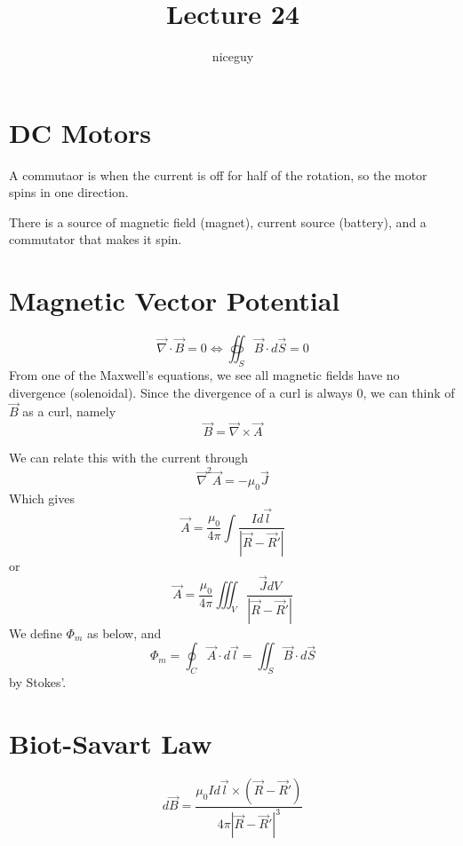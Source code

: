 \documentclass[12pt]{article}
\author{niceguy}
\title{Lecture 24}
\begin{document}
\maketitle

\section{DC Motors}
A commutaor is when the current is off for half of the rotation, so the motor spins in one direction. 

\begin{ex}
	There is a source of magnetic field (magnet), current source (battery), and a commutator that makes it spin.
\end{ex}

\section{Magnetic Vector Potential}

$$\vec{\nabla} \cdot \vec{B} = 0 \Leftrightarrow \oiint_S \vec{B} \cdot d\vec{S} = 0$$
From one of the Maxwell's equations, we see all magnetic fields have no divergence (solenoidal). Since the divergence of a curl is always 0, we can think of $\vec{B}$ as a curl, namely
$$\vec{B} = \vec{\nabla} \times \vec{A}$$

We can relate this with the current through
$$\vec{\nabla}^2\vec{A} = -\mu_0\vec{J}$$
Which gives
$$\vec{A} = \frac{\mu_0}{4\pi} \int \frac{Id\vec{l}}{|\vec{R}-\vec{R}'|}$$
or
$$\vec{A} = \frac{\mu_0}{4\pi}\iiint_V \frac{\vec{J}dV}{|\vec{R}-\vec{R}'|}$$
We define $\Phi_m$ as below, and
$$\Phi_m = \oint_C \vec{A} \cdot d\vec{l} = \iint_S \vec{B} \cdot d\vec{S}$$
by Stokes'.

\section{Biot-Savart Law}

$$d\vec{B} = \frac{\mu_0Id\vec{l}\times(\vec{R}-\vec{R}')}{4\pi|\vec{R}-\vec{R}'|^3}$$
\end{document}
